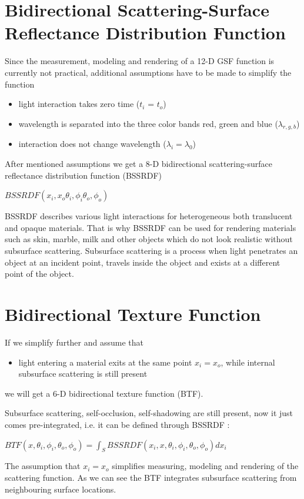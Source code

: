\section{Bidirectional Scattering-Surface Reflectance Distribution Function}
\label{section:BSSRDF}
 Since the measurement, modeling and rendering of a 12-D GSF function is currently not practical, additional assumptions have to be made to simplify the function \cite{star2004}


\begin{itemize}
 \item light interaction takes zero time ($t_{i}$  = $t_{o}$)
 \item wavelength is separated into the three color bands red, green and blue ($\lambda_{r,g,b}$)
 \item interaction does not change wavelength ($\lambda_{i}= \lambda_{0}$)
\end{itemize}

After mentioned assumptions we get a 8-D bidirectional scattering-surface reflectance distribution function (BSSRDF)
 \begin{center}
$BSSRDF(x_{i},x_{o}\theta_{i} ,\phi_{i}\theta_{o} ,\phi_{o})$
 \end{center}


BSSRDF describes various light interactions for heterogeneous both translucent and opaque materials.
That is why BSSRDF can be used for rendering materials such as skin, marble, milk and other objects which do not look realistic without subsurface scattering. 
Subsurface scattering is a process when light penetrates an object at an incident point, travels inside the object and exists at a different point of the object.

\section{Bidirectional Texture Function}
\label{section:btf}
If we simplify further and assume that

\begin{itemize}
 \item light entering a material exits at the same point $x_{i}=x_{o}$, while internal subsurface scattering is still present
\end{itemize}

we will get a 6-D bidirectional texture function (BTF).

Subsurface scattering, self-occlusion, self-shadowing  are still present, now it just comes pre-integrated, i.e. it can be defined through BSSRDF \cite{star2004}:
 \begin{center}
$ BTF(x,\theta_{i} ,\phi_{i},\theta_{o} ,\phi_{o})=\int_{S}BSSRDF(x_{i},x,\theta_{i} ,\phi_{i},\theta_{o} ,\phi_{o}) dx_{i}$
 \end{center}
  The assumption that $x_{i}=x_{o}$ simplifies measuring, modeling and rendering of the scattering function. 
 As we can see the BTF integrates subsurface scattering from neighbouring surface locations. 

